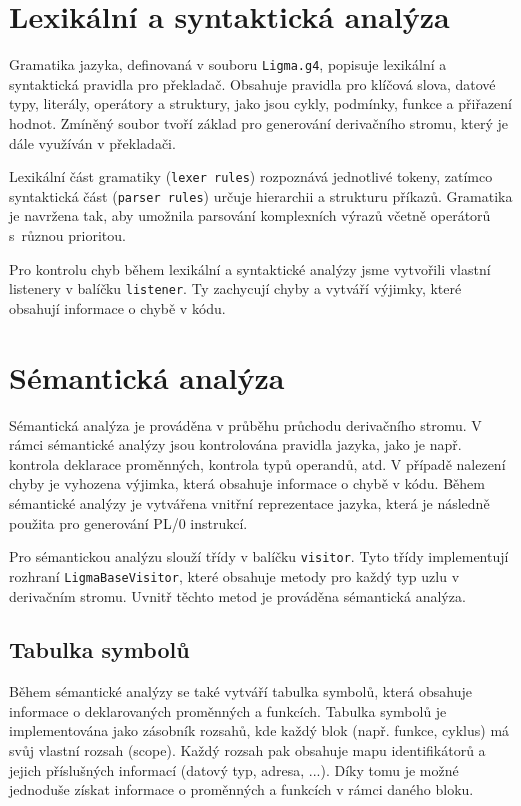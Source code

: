 \documentclass[czech, oth, kiv, he, iso690numb, viewonly]{fasthesis}
\begin{document}
    \pagebreak

    \section{Lexikální a syntaktická analýza}

    Gramatika jazyka, definovaná v souboru \texttt{Ligma.g4}, popisuje lexikální a syntaktická pravidla pro překladač.
    Obsahuje pravidla pro klíčová slova, datové typy, literály, operátory a struktury, jako jsou cykly, podmínky, funkce a přiřazení hodnot.
    Zmíněný soubor tvoří základ pro generování derivačního stromu, který je dále využíván v překladači.
    
    Lexikální část gramatiky (\texttt{lexer rules}) rozpoznává jednotlivé tokeny, zatímco syntaktická část (\texttt{parser rules}) určuje hierarchii a strukturu příkazů. 
    Gramatika je navržena tak, aby umožnila parsování komplexních výrazů včetně operátorů s~různou prioritou. 

    Pro kontrolu chyb během lexikální a syntaktické analýzy jsme vytvořili vlastní listenery v balíčku \texttt{listener}.
    Ty zachycují chyby a vytváří výjimky, které obsahují informace o chybě v kódu.

    \section{Sémantická analýza}

    Sémantická analýza je prováděna v průběhu průchodu derivačního stromu.
    V rámci sémantické analýzy jsou kontrolována pravidla jazyka, jako je např. kontrola deklarace proměnných, kontrola typů operandů, atd.
    V případě nalezení chyby je vyhozena výjimka, která obsahuje informace o chybě v kódu.
    Během sémantické analýzy je vytvářena vnitřní reprezentace jazyka, která je následně použita pro generování PL/0 instrukcí.

    Pro sémantickou analýzu slouží třídy v balíčku \texttt{visitor}.
    Tyto třídy implementují rozhraní \texttt{LigmaBaseVisitor}, které obsahuje metody pro každý typ uzlu v derivačním stromu.
    Uvnitř těchto metod je prováděna sémantická analýza.

    \subsection{Tabulka symbolů}

    Během sémantické analýzy se také vytváří tabulka symbolů, která obsahuje informace o deklarovaných proměnných a funkcích.
    Tabulka symbolů je implementována jako zásobník rozsahů, kde každý blok (např. funkce, cyklus) má svůj vlastní rozsah (scope).
    Každý rozsah pak obsahuje mapu identifikátorů a jejich příslušných informací (datový typ, adresa, ...).
    Díky tomu je možné jednoduše získat informace o proměnných a funkcích v rámci daného bloku.
\end{document}
